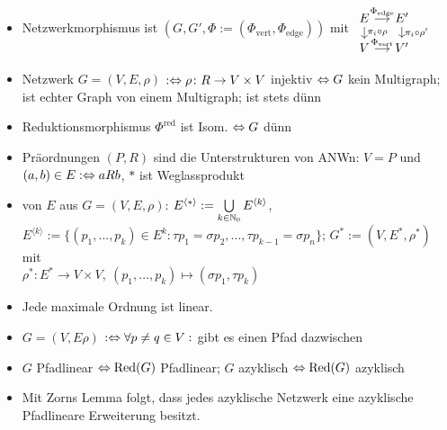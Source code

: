 \documentclass[12pt]{scrartcl}
\begin{document}
\begin{itemize}
		\item Netzwerkmorphismus ist $(G,G',\Phi:=(\Phi_{\text{vert}},\Phi_{\text{edge}}))$ mit
		$\begin{tikzcd}[column sep=small, row sep=small]
        E \dar{\pi_i \circ \rho} \rar{\Phi_{\text{edge}}} & E' \dar{\pi_i \circ \rho'}\\
        V \rar{\Phi_{\text{vert}}} & V' 
    \end{tikzcd}$
	    \item Netzwerk $G=(V,E,\rho)$  $:\Leftrightarrow\rho\colon R\to V\times V$ injektiv $\Leftrightarrow G$ kein Multigraph;  ist echter Graph von einem Multigraph; ist stets dünn
	    \item Reduktionsmorphismus $\Phi^{\text{red}}$ ist Isom. $\Leftrightarrow G$ dünn
		\item Präordnungen $(P,R)$ sind die Unterstrukturen von ANWn: $V=P$ und $(a,b)\in E:\Leftrightarrow aRb$, $\ast$ ist Weglassprodukt	    
	    \item {} von $E$ aus $G=(V,E,\rho)$:
	    $E^{\langle\ast\rangle}:=\bigcup\limits_{k\in\mathbb{N}_0} E^{\langle k\rangle}$,\\
	    $E^{\langle k\rangle}:=\lbrace(p_1,\ldots,p_k)\in E^k:\tau p_1=\sigma p_2,\ldots,\tau p_{k-1}=\sigma p_n\rbrace$; 
	    $G^\ast:=(V,E^\ast,\rho^\ast)$ mit\\ $\rho^\ast\colon E^\ast\to V\times V,~(p_1,\ldots,p_k)\mapsto(\sigma p_1,\tau p_k)$
	    \item Jede maximale Ordnung ist linear.
	    \item $G=(V,E\rho)$  $:\Leftrightarrow\forall p\neq q\in V:$ gibt es einen Pfad dazwischen
	    
	    \item $G$ Pfadlinear $\Leftrightarrow\operatorname{Red}(G)$ Pfadlinear; $G$ azyklisch $\Leftrightarrow\operatorname{Red}(G)$ azyklisch
	    \item Mit Zorns Lemma folgt, dass jedes azyklische Netzwerk eine azyklische Pfadlineare Erweiterung besitzt.

	\end{itemize}
	
\end{document}
